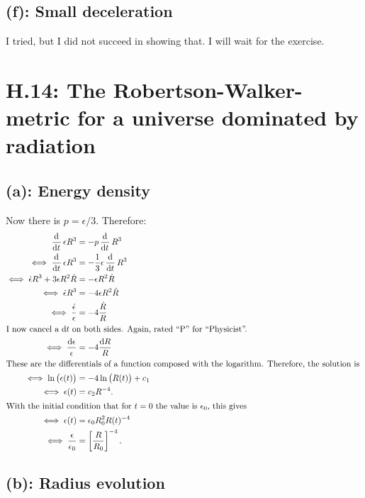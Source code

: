 \subsection*{(f): Small deceleration}

I tried, but I did not succeed in showing that. I will wait for the exercise.

\section*{H.14: The Robertson-Walker-metric for a universe dominated by
radiation}

\subsection*{(a): Energy density}

Now there is $p = \epsilon/3$. Therefore:
\begin{align*}
    \dod{}t \epsilon R^3 &= - p \dod{}t R^3 \\
    \iff \dod{}t \epsilon R^3 &= - \frac13 \epsilon \dod{}t R^3 \\
    \iff \dot \epsilon R^3 + 3 \epsilon R^2 \dot R &= - \epsilon R^2 \dot R \\
    \iff \dot \epsilon R^3 &= - 4 \epsilon R^2 \dot R \\
    \iff \frac{\dot\epsilon}{\epsilon} &= -4 \frac{\dot R}{R} \\
    \intertext{%
        I now cancel a $\dif t$ on both sides. Again, rated “P” for
        “Physicist”.
    }
    \iff \frac{\dif\epsilon}{\epsilon} &= -4 \frac{\dif R}{R} \\
    \intertext{%
        These are the differentials of a function composed with the logarithm.
        Therefore, the solution is
    }
    \iff \ln\del{\epsilon(t)} &= -4 \ln\del{R(t)} + c_1 \\
    \iff \epsilon(t) &= c_2 R^{-4}. \\
    \intertext{%
        With the initial condition that for $t = 0$ the value is $\epsilon_0$,
        this gives
    }
    \iff \epsilon(t) &= \epsilon_0 R_0^2 R(t)^{-4} \\
    \iff \frac{\epsilon}{\epsilon_0} &= \sbr{\frac{R}{R_0}}^{-4}.
\end{align*}

\subsection*{(b): Radius evolution}

